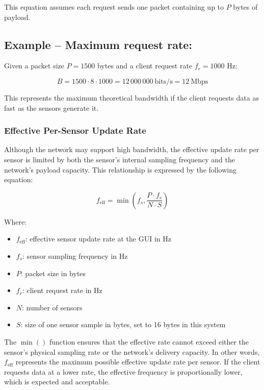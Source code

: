 \documentclass{article}
\begin{document}
This equation assumes each request sends one packet containing up to $P$ bytes of payload.

\subsection*{Example – Maximum request rate:}
Given a packet size $P = 1500$ bytes and a client request rate $f_r = 1000$ Hz:

\begin{equation}
B = 1500 \cdot 8 \cdot 1000 = 12\,000\,000~\text{bits/s} = 12~\text{Mbps}
\end{equation}


This represents the maximum theoretical bandwidth if the client requests data as fast as the sensors generate it.


\subsubsection{Effective Per-Sensor Update Rate}

Although the network may support high bandwidth, the effective update rate per sensor is limited by both the sensor's internal sampling frequency and the network's payload capacity. This relationship is expressed by the following equation:

\begin{equation}
f_{\text{eff}} = \min \left( f_s, \frac{P \cdot f_r}{N \cdot S} \right)
\end{equation}


Where:
\begin{itemize}
    \item[] $f_{\text{eff}}$: effective sensor update rate at the GUI in Hz
    \item[] $f_s$: sensor sampling frequency in Hz
    \item[] $P$: packet size in bytes
    \item[] $f_r$: client request rate in Hz
    \item[] $N$: number of sensors
    \item[] $S$: size of one sensor sample in bytes, set to 16 bytes in this system
\end{itemize}


The $\min()$ function ensures that the effective rate cannot exceed either the sensor's physical sampling rate or the network's delivery capacity.
In other words, $f_{\text{eff}}$ represents the maximum possible effective update rate per sensor. 
If the client requests data at a lower rate, the effective frequency is proportionally 
lower, which is expected and acceptable.
\end{document}
